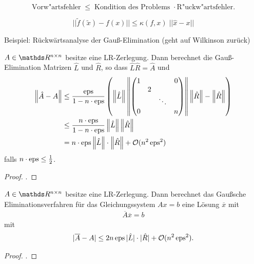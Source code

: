 \begin{Beme}
  $$ \mbox{Vorw"artsfehler} \; \leq \; \mbox{Kondition des
    Problems } \cdot \mbox{R"uckw"artsfehler} .$$
  
  $$ ||\tilde f (\tilde x)  - f(x)|| \leq \kappa (f,x) \; || \hat x -x|| $$
  
  Beispiel: Rückwärtsanalyse der Gauß-Elimination
  (geht auf Wilkinson zurück)
\end{Beme}


\begin{Satze}
  $A \in \R^{n\times n}$ besitze eine LR-Zerlegung. Dann berechnet die
  Gauß-Elimination Matrizen $\hat{L}$ und $\hat{R}$,
  so dass $\hat{L}\hat{R} =\hat{A}$
  und
  \begin{align*}
     \nn[\hat{A}-A] 
     & \leq 
       \frac{\Eps}{1-n \cdot \Eps}
       \left( \nn[\hat{L}]
       \nn[{\begin{pmatrix}
         1 && & 0\\
         &2\\
         &&\ddots \\
         0&&& n\\
       \end{pmatrix}}]
    \nn[\hat{R}]-\nn[\hat{R}]
     \right)\\
    & \leq  \frac{n\cdot \Eps}{1-n\cdot \Eps}\nn[\hat{L}]\nn[\hat{R}] \\
    & = n\cdot \Eps \nn[\hat{L}]\cdot \nn[\hat{R}] 
      + \mathcal{O}( n^2 \Eps^2)
  \end{align*}
  falls $n\cdot \Eps \leq \frac{1}{2}$.
\end{Satze}
\begin{proof}
  \cite[siehe][]{stoerbulirsch}.
\end{proof}


\begin{Satze}[Sautter 1971]
  $ A \in \R^{n\times n}$ besitze eine LR-Zerlegung.  Dann berechnet das
  Gaußsche Eliminationsverfahren für das Gleichungssystem
  $Ax = b$ eine Lösung $\overline{x}$ mit 
  \begin{gather*} \overline{A} \overline{x} = b\end{gather*}
  mit
  \begin{gather*} 
    |\overline{A}-A|  \leq  2n\Eps
    |\hat{L}| \cdot |\hat{R}| + \mathcal{O}( n^2 \Eps^2).
  \end{gather*}
\end{Satze}

\begin{proof}
  \cite[siehe][]{deuflhardhohmann}.
\end{proof}

